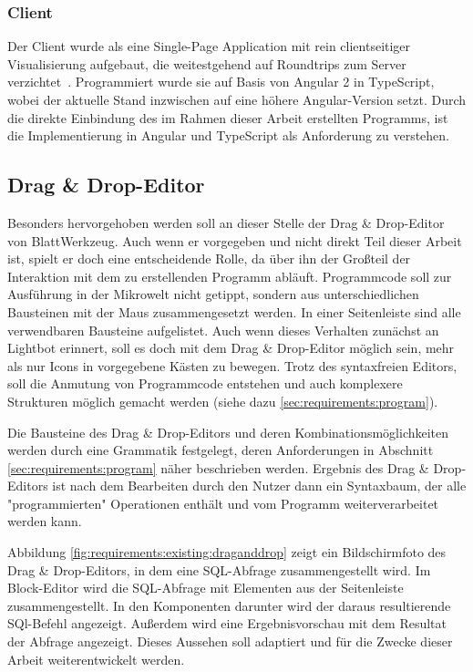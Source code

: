 \subsubsection{Client}

Der Client wurde als eine Single-Page Application mit rein clientseitiger Visualisierung aufgebaut, die weitestgehend auf Roundtrips zum Server verzichtet~\cite[94-95]{riemer2016}. Programmiert wurde sie auf Basis von Angular 2 in TypeScript, wobei der aktuelle Stand inzwischen auf eine höhere Angular-Version setzt. Durch die direkte Einbindung des im Rahmen dieser Arbeit erstellten Programms, ist die Implementierung in Angular und TypeScript als Anforderung zu verstehen.

\subsection{Drag \& Drop-Editor}
\label{sec:requirements:existing:structure:drag-drop}

Besonders hervorgehoben werden soll an dieser Stelle der Drag \& Drop-Editor von BlattWerkzeug. Auch wenn er vorgegeben und nicht direkt Teil dieser Arbeit ist, spielt er doch eine entscheidende Rolle, da über ihn der Großteil der Interaktion mit dem zu erstellenden Programm abläuft. Programmcode soll zur Ausführung in der Mikrowelt nicht getippt, sondern aus unterschiedlichen Bausteinen mit der Maus zusammengesetzt werden. In einer Seitenleiste sind alle verwendbaren Bausteine aufgelistet. Auch wenn dieses Verhalten zunächst an Lightbot erinnert, soll es doch mit dem Drag \& Drop-Editor möglich sein, mehr als nur Icons in vorgegebene Kästen zu bewegen. Trotz des syntaxfreien Editors, soll die Anmutung von Programmcode entstehen und auch komplexere Strukturen möglich gemacht werden (siehe dazu \ref{sec:requirements:program}).

Die Bausteine des Drag \& Drop-Editors und deren Kombinationsmöglichkeiten werden durch eine Grammatik festgelegt, deren Anforderungen in Abschnitt \ref{sec:requirements:program} näher beschrieben werden. Ergebnis des Drag \& Drop-Editors ist nach dem Bearbeiten durch den Nutzer dann ein Syntaxbaum, der alle "programmierten" Operationen enthält und vom Programm weiterverarbeitet werden kann.


Abbildung \ref{fig:requirements:existing:draganddrop} zeigt ein Bildschirmfoto des Drag \& Drop-Editors, in dem eine SQL-Abfrage zusammengestellt wird. Im Block-Editor wird die SQL-Abfrage mit Elementen aus der Seitenleiste zusammengestellt. In den Komponenten darunter wird der daraus resultierende SQl-Befehl angezeigt. Außerdem wird eine Ergebnisvorschau mit dem Resultat der Abfrage angezeigt. Dieses Aussehen soll adaptiert und für die Zwecke dieser Arbeit weiterentwickelt werden.

